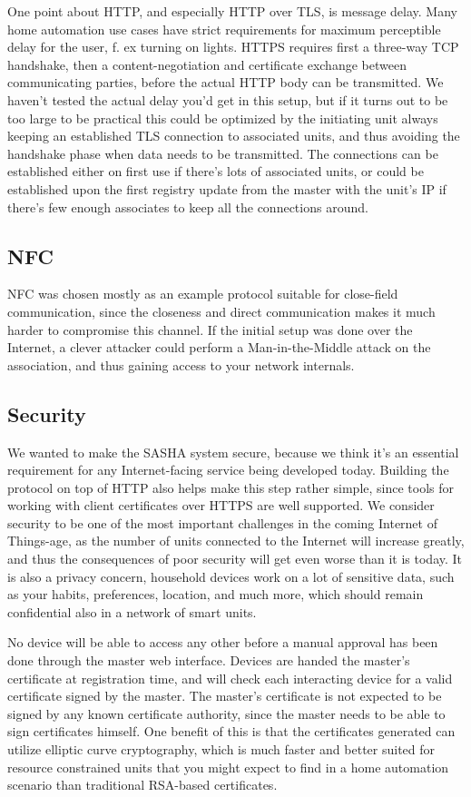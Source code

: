 One point about HTTP, and especially HTTP over TLS, is message delay. Many home automation use cases have strict requirements for maximum perceptible delay for the user, f. ex turning on lights. HTTPS requires first a three-way TCP handshake, then a content-negotiation and certificate exchange between communicating parties, before the actual HTTP body can be transmitted. We haven't tested the actual delay you'd get in this setup, but if it turns out to be too large to be practical this could be optimized by the initiating unit always keeping an established TLS connection to associated units, and thus avoiding the handshake phase when data needs to be transmitted. The connections can be established either on first use if there's lots of associated units, or could be established upon the first registry update from the master with the unit's IP if there's few enough associates to keep all the connections around.

\subsection{NFC}
NFC was chosen mostly as an example protocol suitable for close-field communication, since the closeness and direct communication makes it much harder to compromise this channel. If the initial setup was done over the Internet, a clever attacker could perform a Man-in-the-Middle attack on the association, and thus gaining access to your network internals.

\subsection{Security}
We wanted to make the SASHA system secure, because we think it's an essential requirement for any Internet-facing service being developed today. Building the protocol on top of HTTP also helps make this step rather simple, since tools for working with client certificates over HTTPS are well supported. We consider security to be one of the most important challenges in the coming Internet of Things-age, as the number of units connected to the Internet will increase greatly, and thus the consequences of poor security will get even worse than it is today. It is also a privacy concern, household devices work on a lot of sensitive data, such as your habits, preferences, location, and much more, which should remain confidential also in a network of smart units.

No device will be able to access any other before a manual approval has been done through the master web interface. Devices are handed the master's certificate at registration time, and will check each interacting device for a valid certificate signed by the master. The master's certificate is not expected to be signed by any known certificate authority, since the master needs to be able to sign certificates himself. One benefit of this is that the certificates generated can utilize elliptic curve cryptography, which is much faster and better suited for resource constrained units that you might expect to find in a home automation scenario than traditional RSA-based certificates.

